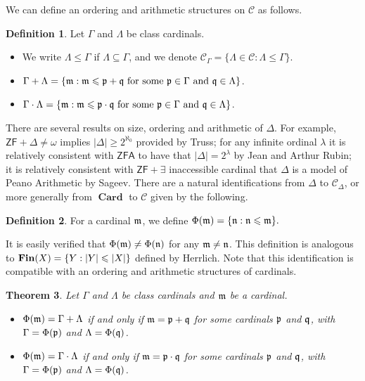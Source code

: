 \documentclass{amsart}
\newcommand{\ZF}{\ensuremath{\mathsf{ZF}}}
\newcommand{\ZFA}{\ensuremath{\mathsf{ZFA}}}
\newcommand{\CFin}{\mathscr{C}}
\newcommand{\Fin}{\textbf{\textup{Fin}}}
\DeclareMathOperator{\Card}{\textbf{Card}}
\renewcommand{\leq}{\leqslant}
\renewcommand{\geq}{\geqslant}
\newcommand{\1}{\ensuremath{\mathds{1}}}
\theoremstyle{plain}
\newtheorem{thm}{Theorem}[section]
\theoremstyle{boldrk}
\theoremstyle{definition}
\newtheorem{defn}[thm]{Definition}
\begin{document}
We can define an ordering and arithmetic structures on $\CFin$ as follows.
\begin{defn}
Let $\Gamma$ and $\Lambda$ be class cardinals.
\begin{itemize}
    \item  We write $\Lambda\leq\Gamma$ if $\Lambda\subseteq\Gamma$, and we denote $\CFin_{\Gamma}=\{\Lambda\in\CFin:\Lambda\leq\Gamma\}$. 
     \item $\Gamma+\Lambda=\{\frak{m}:\frak{m}\leq\frak{p}+\frak{q}\text{ for some }\frak{p}\in\Gamma\text{ and }\frak{q}\in\Lambda\}$.
    \item $\Gamma\cdot\Lambda=\{\frak{m}:\frak{m}\leq\frak{p}\cdot\frak{q}\text{ for some }\frak{p}\in\Gamma\text{ and }\frak{q}\in\Lambda\}$.
\end{itemize}
\end{defn}


  
There are several results on size, ordering and arithmetic of $\Delta$. For example, $\ZF+\Delta\neq\omega$ implies $|\Delta|\geq2^{\aleph_{0}}$ provided by Truss; for any infinite ordinal $\lambda$ it is relatively consistent with $\ZFA$ to have that $|\Delta|=2^{\lambda}$ by Jean and Arthur Rubin; it is relatively consistent with $\ZF+\exists$ inaccessible cardinal that $\Delta$ is a model of Peano Arithmetic by Sageev. There are a natural identifications from $\Delta$ to $\CFin_{\Delta}$, or more generally from $\Card$ to $\CFin$ given by the following.

\begin{defn}
    For a cardinal $\frak{m}$, we define $\Phi(\frak{m})=\{\frak{n}:\frak{n}\leq\frak{m}\}.$
\end{defn}

It is easily verified that $\Phi(\frak{m})\neq\Phi(\frak{n})$ for any $\frak{m}\neq\frak{n}$. This definition is analogous to $\Fin(X)=\{Y:|Y|\leq |X|\}$ defined by Herrlich. Note that this identification is compatible with an ordering and arithmetic structures of cardinals.

\begin{thm}
 Let $\Gamma$ and $\Lambda$ be class cardinals and $\frak{m}$ be a cardinal.  
 \begin{itemize}
     \item $\Phi(\frak{m})=\Gamma+\Lambda$ if and only if $\frak{m}=\frak{p}+\frak{q}$ for some cardinals $\frak{p}$ and $\frak{q}$, with $\Gamma=\Phi(\frak{p})$ and $\Lambda=\Phi(\frak{q})$.
    \item $\Phi(\frak{m})=\Gamma\cdot\Lambda$ if and only if $\frak{m}=\frak{p}\cdot\frak{q}$ for some cardinals $\frak{p}$ and $\frak{q}$, with $\Gamma=\Phi(\frak{p})$ and $\Lambda=\Phi(\frak{q})$.
\end{itemize}
\end{thm}
\end{document}
